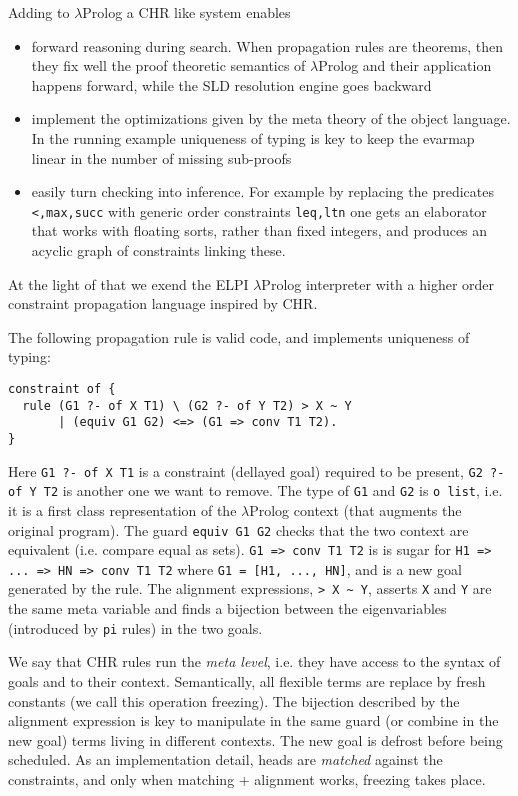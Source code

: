 \documentclass{easychair}
\begin{document}
Adding to $\lambda$Prolog a CHR like system enables
\begin{itemize}
\item forward reasoning during search. When propagation rules are theorems,
	then they fix well the proof theoretic semantics of $\lambda$Prolog
	and their application happens forward, while the SLD resolution engine
	goes backward
\item implement the optimizations given by the meta theory of the object
	language.  In the running example uniqueness of typing is key to keep
	the evarmap linear in the number of missing sub-proofs
\item easily turn checking into inference.  For example by replacing the
	predicates \verb+<,max,succ+ with generic order constraints
	\verb+leq,ltn+ one gets an elaborator that works with floating sorts,
	rather than fixed integers, and produces an acyclic graph of
	constraints linking these.
\end{itemize}

At the light of that we exend the ELPI $\lambda$Prolog interpreter
with a higher order constraint propagation language inspired by CHR.

The following propagation rule is valid code, and implements
uniqueness of typing:

\begin{verbatim}
constraint of {
  rule (G1 ?- of X T1) \ (G2 ?- of Y T2) > X ~ Y
       | (equiv G1 G2) <=> (G1 => conv T1 T2).
}
\end{verbatim}

Here \verb+G1 ?- of X T1+ is a constraint (dellayed goal) required
to be present, \verb+G2 ?- of Y T2+ is another one we want to remove.
The type of \verb+G1+ and \verb+G2+ is \verb+o list+, i.e.
it is a first class representation of the $\lambda$Prolog context
(that augments the original program).  
The guard \verb+equiv G1 G2+ checks that the two context are equivalent (i.e.
compare equal as sets).  \verb+G1 => conv T1 T2+ is
is sugar for \verb+H1 => ... => HN => conv T1 T2+ where
\verb+G1 = [H1, ..., HN]+, and is a new goal generated by the rule.
The alignment expressions, \verb+> X ~ Y+, asserts \verb+X+ and \verb+Y+
are the same meta variable and finds a bijection between the
eigenvariables (introduced by \verb+pi+ rules) in the two goals.

We say that CHR rules run the \emph{meta level}, i.e. they have access
to the syntax of goals and to their context.  Semantically, all flexible
terms are replace by fresh constants (we call this operation freezing).
The bijection described by the alignment expression is key to
manipulate in the same guard (or combine in the new goal) terms
living in different contexts.  The new goal is defrost before being
scheduled.  As an implementation detail, heads are \emph{matched} against the
constraints, and only when matching + alignment works, freezing takes place.
\end{document}
